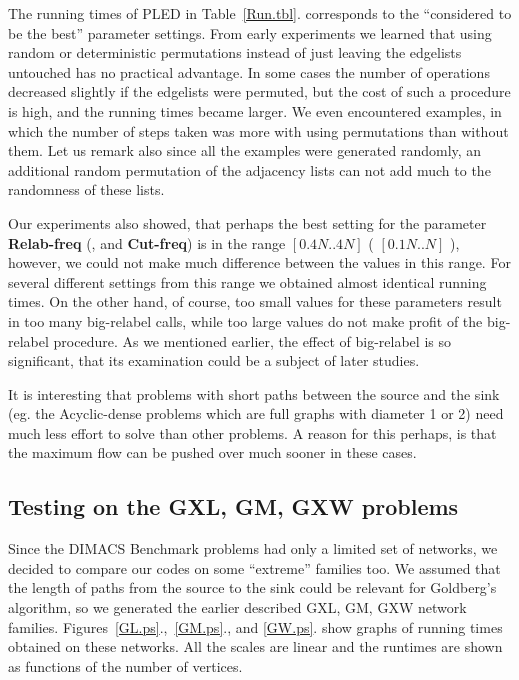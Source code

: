 The running times of PLED in Table~\ref{Run.tbl}. corresponds to the
``considered to be the best'' parameter settings. From early
experiments we learned that using random 
or deterministic permutations instead of just leaving the edgelists
untouched has no practical advantage. In some cases the number of
operations decreased slightly if the edgelists were permuted, but the
cost of such a procedure is high, and the running times became larger.
We even encountered examples, in which the number of 
steps taken was more with using permutations than without them.
Let us remark also since all the examples were generated randomly, an
additional random permutation of the adjacency lists can not add much
to the randomness of these lists. 


Our experiments also showed, that perhaps the best setting for the
parameter {\bf Relab-freq} (, and {\bf Cut-freq}) is in the range 
$[0.4N..4N]$ ( $[0.1N..N]$ ), however, we could not make much
difference between the values in this range. For several different
settings from this range we obtained almost identical running times.
On the other hand, of course, 
too small values for these parameters result in too many big-relabel
calls, while too large values do not make profit of the big-relabel
procedure. As we mentioned earlier, the effect of big-relabel is so 
significant, that its examination could be a subject of later studies.


It is interesting that problems with short paths between the source
and the sink (eg. the Acyclic-dense problems which are full graphs with
diameter 1 or 2) need much less effort to solve than other problems. 
A reason for this perhaps, is that the maximum flow can be pushed over
much sooner in these cases. 

\clearpage
\subsection{Testing on the GXL, GM, GXW problems}

Since the DIMACS Benchmark problems had only a limited set of
networks, we decided to compare our codes on some ``extreme'' families
too. We assumed that the length of paths from the source to the sink
could be relevant for Goldberg's algorithm, so we generated the
earlier described GXL, GM, GXW network families.
Figures~\ref{GL.ps}.,~\ref{GM.ps}., and \ref{GW.ps}. show graphs of
running times obtained on these networks. All the scales are linear
and the runtimes are shown as functions of the number of vertices.  

